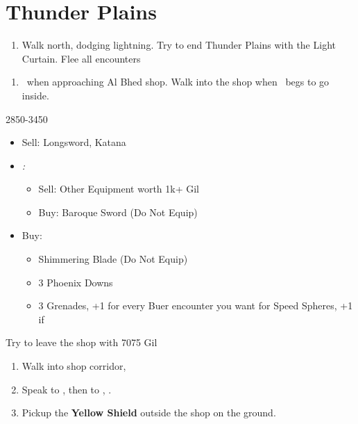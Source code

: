 \chapter{Thunder Plains}

\begin{enumerate}
  \item Walk north, dodging lightning. Try to end Thunder Plains with the Light Curtain. Flee all encounters
\end{enumerate}
\begin{enumerate}[resume]
  \item \sd\ when approaching Al Bhed shop. Walk into the shop when \rikku\ begs to go inside.
\end{enumerate}
\begin{shop}{2850-3450}
  \begin{itemize}
    \item Sell: Longsword, Katana
    \item \textit{\blitzloss:}
          \begin{itemize}
            \item Sell: Other Equipment worth 1k+ Gil
            \item Buy: Baroque Sword (Do Not Equip)
          \end{itemize}
    \item Buy:
          \begin{itemize}
            \item Shimmering Blade (Do Not Equip)
            \item 3 Phoenix Downs
            \item 3 Grenades, +1 for every Buer encounter you want for Speed Spheres, +1 if \blitzloss
          \end{itemize}
  \end{itemize}
Try to leave the shop with 7075 Gil
\end{shop}
\begin{enumerate}[resume]
  \item Walk into shop corridor, \cs[2:00]
  \item Speak to \auron, then to \rikku, \sd.
  \item Pickup the \textbf{Yellow Shield} outside the shop on the ground.
  \end{enumerate}
  
